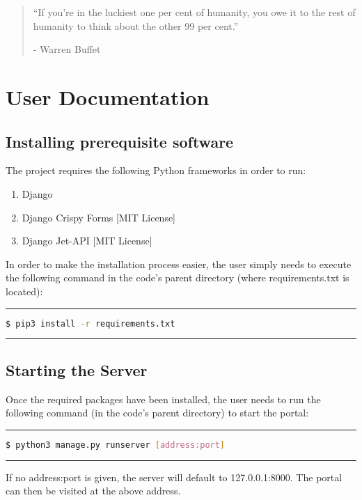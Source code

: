 \documentclass[14pt]{extarticle}
\begin{document}
{\large
\begin{quote}
\enquote{If you're in the luckiest one per cent of humanity, you owe it to the rest of humanity to think about the other 99 per cent.}\begin{flushright}- Warren Buffet\end{flushright}
\end{quote}
}

\newpage
\section{User Documentation}
\subsection{Installing prerequisite software}
The project requires the following Python frameworks in order to run:
\begin{enumerate}
    \item Django
    \item Django Crispy Forms [MIT License]
    \item Django Jet-API [MIT License]
\end{enumerate}
In order to make the installation process easier, the user simply needs to execute the following command in the code's parent directory (where requirements.txt is located):
\newline
\noindent\rule{\textwidth}{0.5pt}
\begin{lstlisting}[language=bash]
  $ pip3 install -r requirements.txt
\end{lstlisting}
\noindent\rule{\textwidth}{0.5pt}

\subsection{Starting the Server}
Once the required packages have been installed, the user needs to run the following command (in the code's parent directory) to start the portal:
\newline
\noindent\rule{\textwidth}{0.5pt}
\begin{lstlisting}[language=bash]
  $ python3 manage.py runserver [address:port]
\end{lstlisting}
\noindent\rule{\textwidth}{0.5pt}

If no address:port is given, the server will default to 127.0.0.1:8000.
\newline
The portal can then be visited at the above address.
\end{document}
